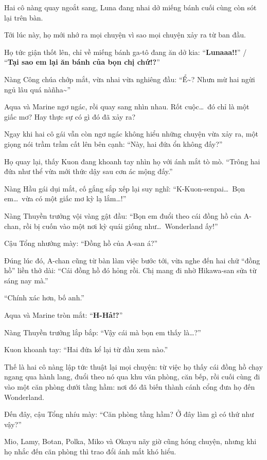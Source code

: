 \documentclass[../main.tex]{subfiles}
\begin{document}
Hai cô nàng quay ngoắt sang, Luna đang nhai dở miếng bánh cuối cùng còn sót lại trên bàn.

Tới lúc này, họ mới nhớ ra mọi chuyện vì sao mọi chuyện xảy ra từ ban đầu.

Họ tức giận thốt lên, chỉ về miếng bánh ga-tô đang ăn dở kia: ``\textbf{Lunaaa!!}'' / ``\textbf{Tại sao em lại ăn bánh của bọn chị chứ!?}''

Nàng Công chúa chớp mắt, vừa nhai vừa nghiêng đầu: ``Ể\~{}? Nhưn mừ hai ngừi ngủ lâu quá nà\~ nha\~{}''

Aqua và Marine ngơ ngác, rồi quay sang nhìn nhau. Rốt cuộc\dots\ đó chỉ là một giấc mơ? Hay thực sự có gì đó đã xảy ra?

Ngay khi hai cô gái vẫn còn ngơ ngác không hiểu những chuyện vừa xảy ra, một giọng nói trầm trầm cất lên bên cạnh: ``Này, hai đứa ổn không đấy?''

Họ quay lại, thấy Kuon đang khoanh tay nhìn họ với ánh mắt tò mò. ``Trông hai đứa như thể vừa mới thức dậy sau cơn ác mộng đấy.''

Nàng Hầu gái dụi mắt, cố gắng sắp xếp lại suy nghĩ: ``K-Kuon-senpai\dots\ Bọn em\dots\ vừa có một giấc mơ kỳ lạ lắm\dots!''

Nàng Thuyền trưởng vội vàng gật đầu: ``Bọn em đuổi theo cái đồng hồ của A-chan, rồi bị cuốn vào một nơi kỳ quái giống như\dots\ Wonderland ấy!''

Cậu Tổng nhướng mày: ``Đồng hồ của A-san á?''

Đúng lúc đó, A-chan cũng từ bàn làm việc bước tới, vừa nghe đến hai chữ ``đồng hồ'' liền thở dài: ``Cái đồng hồ đó hỏng rồi. Chị mang đi nhờ Hikawa-san sửa từ sáng nay mà.''

``Chính xác hơn, bố anh.''

Aqua và Marine tròn mắt: ``\textbf{H-Hả!?}''

Nàng Thuyền trưởng lắp bắp: ``Vậy cái mà bọn em thấy là\dots?''

Kuon khoanh tay: ``Hai đứa kể lại từ đầu xem nào.''

Thế là hai cô nàng lập tức thuật lại mọi chuyện: từ việc họ thấy cái đồng hồ chạy ngang qua hành lang, đuổi theo nó qua khu văn phòng, căn bếp, rồi cuối cùng đi vào một căn phòng dưới tầng hầm: nơi đó đã biến thành cánh cổng đưa họ đến Wonderland.

Đến đây, cậu Tổng nhíu mày: ``Căn phòng tầng hầm? Ở đây làm gì có thứ như vậy?''

Mio, Lamy, Botan, Polka, Miko và Okayu nãy giờ cũng hóng chuyện, nhưng khi họ nhắc đến căn phòng thì trao đổi ánh mắt khó hiểu.
\end{document}
